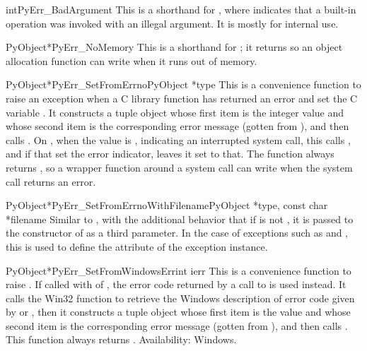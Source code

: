 \begin{cfuncdesc}{int}{PyErr_BadArgument}{}
  This is a shorthand for , where  indicates that a built-in
  operation was invoked with an illegal argument.  It is mostly for
  internal use.
\end{cfuncdesc}

\begin{cfuncdesc}{PyObject*}{PyErr_NoMemory}{}
  This is a shorthand for ; it
  returns \NULL{} so an object allocation function can write
   when it runs out of memory.
\end{cfuncdesc}

\begin{cfuncdesc}{PyObject*}{PyErr_SetFromErrno}{PyObject *type}
  This is a convenience function to raise an exception when a C
  library function has returned an error and set the C variable
  .  It constructs a tuple object whose first item is the
  integer  value and whose second item is the
  corresponding error message (gotten from
  ), and then calls
  .  On \UNIX, when
  the  value is , indicating an
  interrupted system call, this calls
  , and if that set the error
  indicator, leaves it set to that.  The function always returns
  \NULL, so a wrapper function around a system call can write
   when the system call
  returns an error.
\end{cfuncdesc}

\begin{cfuncdesc}{PyObject*}{PyErr_SetFromErrnoWithFilename}{PyObject *type,
                                                             const char *filename}
  Similar to , with the additional
  behavior that if  is not \NULL, it is passed to the
  constructor of  as a third parameter.  In the case of
  exceptions such as  and , this
  is used to define the  attribute of the exception
  instance.
\end{cfuncdesc}

\begin{cfuncdesc}{PyObject*}{PyErr_SetFromWindowsErr}{int ierr}
  This is a convenience function to raise .
  If called with  of , the error code returned by a
  call to  is used instead.  It calls the
  Win32 function  to retrieve the Windows
  description of error code given by  or
  , then it constructs a tuple object whose
  first item is the  value and whose second item is the
  corresponding error message (gotten from
  ), and then calls
  .
  This function always returns \NULL.
  Availability: Windows.
\end{cfuncdesc}

